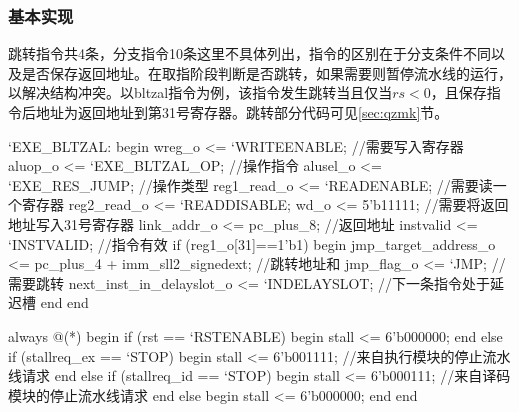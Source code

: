 \subsubsection{基本实现}
    跳转指令共4条，分支指令10条这里不具体列出，指令的区别在于分支条件不同以及是否保存返回地址。在取指阶段判断是否跳转，如果需要则暂停流水线的运行，以解决结构冲突。以bltzal指令为例，该指令发生跳转当且仅当$rs<0$，且保存指令后地址为返回地址到第31号寄存器。跳转部分代码可见\ref{sec:qzmk}节。
    \begin{verilog}
        `EXE_BLTZAL: begin
            wreg_o <= `WRITEENABLE; //需要写入寄存器
            aluop_o <= `EXE_BLTZAL_OP; //操作指令
            alusel_o <= `EXE_RES_JUMP; //操作类型
            reg1_read_o <= `READENABLE; //需要读一个寄存器
            reg2_read_o <= `READDISABLE;
            wd_o <= 5'b11111; //需要将返回地址写入31号寄存器
            link_addr_o <= pc_plus_8;  //返回地址
            instvalid <= `INSTVALID; //指令有效
            if (reg1_o[31]==1'b1) begin
                jmp_target_address_o <= pc_plus_4 + imm_sll2_signedext; //跳转地址和
                jmp_flag_o <= `JMP; //需要跳转
                next_inst_in_delayslot_o <= `INDELAYSLOT; //下一条指令处于延迟槽
            end
        end
    \end{verilog}
    \begin{verilog}
    always @(*) begin
        if (rst == `RSTENABLE) begin
            stall <= 6'b000000;
        end else if (stallreq_ex == `STOP) begin 
            stall <= 6'b001111; //来自执行模块的停止流水线请求
        end else if (stallreq_id == `STOP) begin 
            stall <= 6'b000111; //来自译码模块的停止流水线请求
        end else begin
            stall <= 6'b000000;
        end
    end
    \end{verilog}


